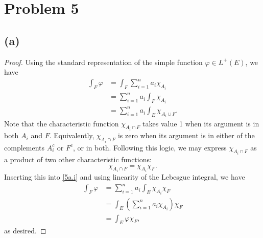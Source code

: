 \documentclass{article}
\begin{document}
\section*{Problem 5}
\subsection*{(a)}
\begin{proof}
	Using the standard representation of the simple function $\varphi \in L^+(E)$, we have
	\begin{align}
		\int_F \varphi &= \int_F \sum_{i=1}^{n} a_i \chi_{A_i} \\
		&= \sum_{i=1}^{n} a_i \int_F\chi_{A_i} \\
		&= \sum_{i=1}^n a_i \int_E \chi_{A_i \cup F}. \label{5a.i}
	\end{align}
	Note that the characteristic function $\chi_{A_i \cap F}$ takes value 1 when its argument is in both $A_i$ and $F$. Equivalently, $\chi_{A_i \cap F}$ is zero when its argument is in either of the complements $A_i^c$ or $F^c$, or in both. Following this logic, we may express $\chi_{A_i \cap F}$ as a product of two other characteristic functions:
	\begin{equation}
		\chi_{A_i \cap F} = \chi_{A_i} \chi_F.
	\end{equation}
	Inserting this into \eqref{5a.i} and using linearity of the Lebesgue integral, we have
	\begin{align}
		\int_F \varphi &= \sum_{i=1}^n a_i \int_E \chi_{A_i} \chi_F \\
		&= \int_E \left(\sum_{i=1}^n a_i \chi_{A_i}\right) \chi_F \\
		&= \int_E \varphi \chi_F,
	\end{align}
	as desired.
\end{proof}
\end{document}
